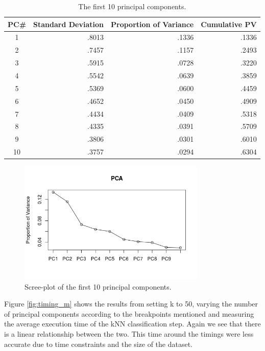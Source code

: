 \documentclass[paper=a4, fontsize=11pt]{scrartcl} %
\begin{document}
\begin{table}[h]
\centering
\caption{The first 10 principal components.}
\label{tab:pca_m}
\begin{tabular}{|c|r|r|r|}
\hline
PC\# & Standard Deviation & Proportion of Variance & Cumulative PV \\ \hline
1    & .8013              & .1336                  & .1336         \\
2    & .7457              & .1157                  & .2493         \\
3    & .5915              & .0728                  & .3220         \\
4    & .5542              & .0639                  & .3859         \\
5    & .5369              & .0600                  & .4459         \\
6    & .4652              & .0450                  & .4909         \\
7    & .4434              & .0409                  & .5318         \\
8    & .4335              & .0391                  & .5709         \\
9    & .3806              & .0301                  & .6010         \\
10   & .3757              & .0294                  & .6304         \\ \hline
\end{tabular}
\end{table}

\begin{figure}[h]
	\centering
	\includegraphics[width=0.8\textwidth]{scree_m.png}
	\caption{Scree-plot of the first 10 principal components.}
	\label{fig:scree_m}
\end{figure}

Figure \ref{fig:timing_m} shows the results from setting k to 50, varying the number of principal components according to the breakpoints mentioned and measuring the average execution time of the kNN classification step. Again we see that there is a linear relationship between the two. This time around the timings were less accurate due to time constraints and the size of the dataset.\par
\end{document}
